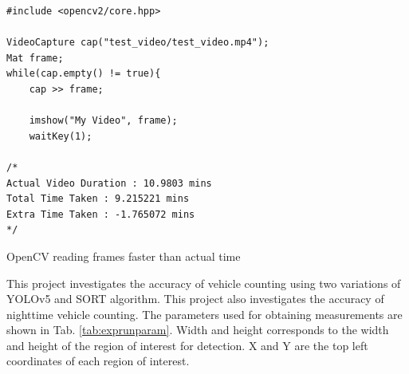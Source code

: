 \documentclass[12pt,a4paper,fleqn]{report}
\begin{document}
\begin{listing}[htbp]
    \centering
{}
\begin{verbatim}
#include <opencv2/core.hpp>

VideoCapture cap("test_video/test_video.mp4");
Mat frame;
while(cap.empty() != true){
    cap >> frame;
   
    imshow("My Video", frame);
    waitKey(1);

/*
Actual Video Duration : 10.9803 mins
Total Time Taken : 9.215221 mins
Extra Time Taken : -1.765072 mins
*/
\end{verbatim}
\caption{OpenCV reading frames faster than actual time}
\label{lst:experiment}
\end{listing}

This project investigates the accuracy of vehicle counting using two variations of YOLOv5 and SORT
algorithm.
This project also investigates the accuracy of nighttime vehicle counting.
The parameters used for obtaining measurements are shown in Tab. \ref{tab:exprunparam}.
Width and height corresponds to the width and height of the region of interest for detection.
X and Y are the top left coordinates of each region of interest.
\end{document}
